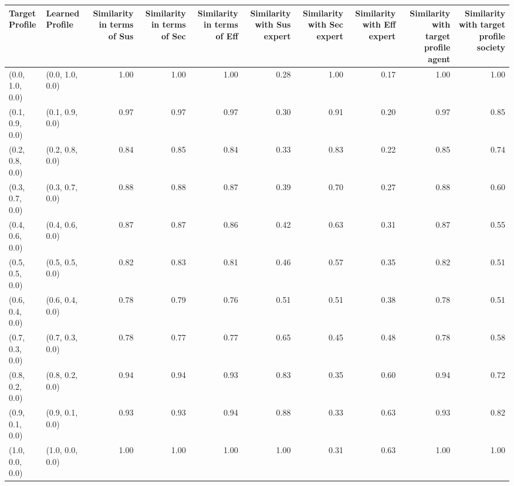 \begin{tabular}{llrrrrrrrr}
\toprule
Target Profile & Learned Profile & Similarity in terms of Sus & Similarity in terms of Sec & Similarity in terms of Eff & Similarity with Sus expert & Similarity with Sec expert & Similarity with Eff expert & Similarity with target profile agent & Similarity with target profile society \\
\midrule
(0.0, 1.0, 0.0) & (0.0, 1.0, 0.0) & 1.00 & 1.00 & 1.00 & 0.28 & 1.00 & 0.17 & 1.00 & 1.00 \\
(0.1, 0.9, 0.0) & (0.1, 0.9, 0.0) & 0.97 & 0.97 & 0.97 & 0.30 & 0.91 & 0.20 & 0.97 & 0.85 \\
(0.2, 0.8, 0.0) & (0.2, 0.8, 0.0) & 0.84 & 0.85 & 0.84 & 0.33 & 0.83 & 0.22 & 0.85 & 0.74 \\
(0.3, 0.7, 0.0) & (0.3, 0.7, 0.0) & 0.88 & 0.88 & 0.87 & 0.39 & 0.70 & 0.27 & 0.88 & 0.60 \\
(0.4, 0.6, 0.0) & (0.4, 0.6, 0.0) & 0.87 & 0.87 & 0.86 & 0.42 & 0.63 & 0.31 & 0.87 & 0.55 \\
(0.5, 0.5, 0.0) & (0.5, 0.5, 0.0) & 0.82 & 0.83 & 0.81 & 0.46 & 0.57 & 0.35 & 0.82 & 0.51 \\
(0.6, 0.4, 0.0) & (0.6, 0.4, 0.0) & 0.78 & 0.79 & 0.76 & 0.51 & 0.51 & 0.38 & 0.78 & 0.51 \\
(0.7, 0.3, 0.0) & (0.7, 0.3, 0.0) & 0.78 & 0.77 & 0.77 & 0.65 & 0.45 & 0.48 & 0.78 & 0.58 \\
(0.8, 0.2, 0.0) & (0.8, 0.2, 0.0) & 0.94 & 0.94 & 0.93 & 0.83 & 0.35 & 0.60 & 0.94 & 0.72 \\
(0.9, 0.1, 0.0) & (0.9, 0.1, 0.0) & 0.93 & 0.93 & 0.94 & 0.88 & 0.33 & 0.63 & 0.93 & 0.82 \\
(1.0, 0.0, 0.0) & (1.0, 0.0, 0.0) & 1.00 & 1.00 & 1.00 & 1.00 & 0.31 & 0.63 & 1.00 & 1.00 \\
\bottomrule
\end{tabular}
